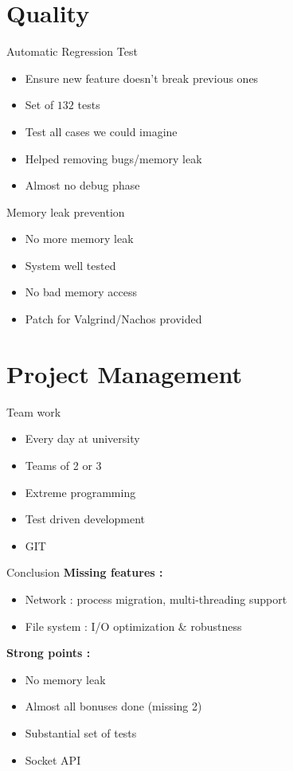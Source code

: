 \documentclass{beamer}
\begin{document}
\section{Quality}
\begin{frame}{Automatic Regression Test}
    \begin{itemize}
        \item Ensure new feature doesn't break previous ones
        \item Set of $132$ tests
        \item Test all cases we could imagine
        \item Helped removing bugs/memory leak
        \item Almost no debug phase
    \end{itemize}
\end{frame}

\begin{frame}{Memory leak prevention}
    \begin{itemize}
        \item No more memory leak
        \item System well tested
        \item No bad memory access
        \item Patch for Valgrind/Nachos provided
    \end{itemize}
\end{frame}

\section{Project Management}
\begin{frame}{Team work}
    \begin{itemize}
        \item Every day at university
        \item Teams of 2 or 3
        \item Extreme programming
        \item Test driven development
        \item GIT
    \end{itemize} 
\end{frame}

\begin{frame}{Conclusion}
    \textbf{Missing features :}
    \begin{itemize}
        \item Network : process migration, multi-threading support
        \item File system : I/O optimization \& robustness
    \end{itemize}

    \textbf{Strong points :}
    \begin{itemize}
        \item No memory leak
        \item Almost all bonuses done (missing 2)
        \item Substantial set of tests
        \item Socket API
    \end{itemize}
\end{frame}
\end{document}
